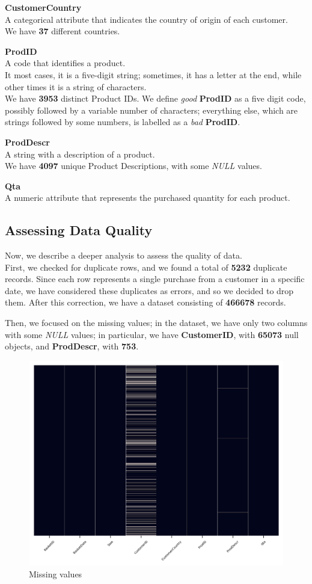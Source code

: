 \textbf{CustomerCountry}\\
A categorical attribute that indicates the country of origin of each customer.\\
We have \textbf{37} different countries.

\textbf{ProdID}\\
A code that identifies a product.\\
It most cases, it is a five-digit string; sometimes, it has a letter at the end, while other times it is a string of characters.\\
We have \textbf{3953} distinct Product IDs.
We define \emph{good} \textbf{ProdID} as a five digit code, possibly followed by a variable number of characters; everything else, which are strings followed by some numbers, is labelled as a \emph{bad} \textbf{ProdID}.

\textbf{ProdDescr}\\  
A string with a description of a product.\\
We have \textbf{4097} unique Product Descriptions, with some \emph{NULL} values.

\textbf{Qta}\\
A numeric attribute that represents the purchased quantity for each product.

\subsection{Assessing Data Quality}
Now, we describe a deeper analysis to assess the quality of data.\\
First, we checked for duplicate rows, and we found a total of \textbf{5232} duplicate records. Since each row represents a single purchase from a customer in a specific date, we have considered these duplicates as errors, and so we decided to drop them. After this correction, we have a dataset consisting of \textbf{466678} records.

Then, we focused on the missing values; in the dataset, we have only two columns with some \emph{NULL} values; in particular, we have \textbf{CustomerID}, with \textbf{65073} null objects, and \textbf{ProdDescr}, with \textbf{753}.

\begin{figure}[h!]
\centering
\includegraphics[height=9cm, width=15cm]{img/missing_values.png}
\caption{Missing values}
\end{figure}

